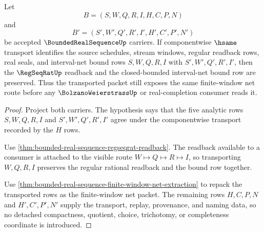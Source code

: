 \begin{theorem}
\label{thm:bounded-real-sequence-regular-readback-stability}
Let
$$
B=(S,W,Q,R,I,H,C,P,N)
$$
and
$$
B'=(S',W',Q',R',I',H',C',P',N')
$$
be accepted $\BoundedRealSequenceUp$ carriers. If componentwise $\hsame$ transport identifies the source schedules, stream windows, regular readback rows, real seals, and interval-net bound rows $S,W,Q,R,I$ with $S',W',Q',R',I'$, then the $\RegSeqRatUp$ readback and the closed-bounded interval-net bound row are preserved. Thus the transported packet still exposes the same finite-window net route before any $\BolzanoWeierstrassUp$ or real-completion consumer reads it.
\end{theorem}
\begin{proof}
Project both carriers. The hypothesis says that the five analytic rows $S,W,Q,R,I$ and $S',W',Q',R',I'$ agree under the componentwise transport recorded by the $H$ rows.

Use \autoref{thm:bounded-real-sequence-regseqrat-readback}. The readback available to a consumer is attached to the visible route $W\mapsto Q\mapsto R\mapsto I$, so transporting $W,Q,R,I$ preserves the regular rational readback and the bound row together.

Use \autoref{thm:bounded-real-sequence-finite-window-net-extraction} to repack the transported rows as the finite-window net packet. The remaining rows $H,C,P,N$ and $H',C',P',N'$ supply the transport, replay, provenance, and naming data, so no detached compactness, quotient, choice, trichotomy, or completeness coordinate is introduced.
\end{proof}

